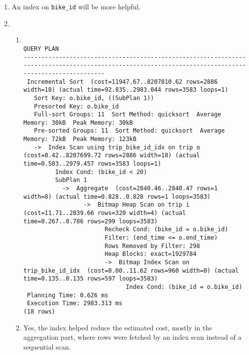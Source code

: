 \documentclass{homework}
\begin{document}
\begin{enumerate}[start=2]
    \item An index on \texttt{bike\_id} will be more helpful.
    

    \item \begin{enumerate}
        \item \begin{verbatim}
                                                                     QUERY PLAN
-----------------------------------------------------------------------------------------------------------------------------------------------------
 Incremental Sort  (cost=11947.67..8207810.62 rows=2886 width=18) (actual time=92.835..2983.044 rows=3583 loops=1)
   Sort Key: o.bike_id, ((SubPlan 1))
   Presorted Key: o.bike_id
   Full-sort Groups: 11  Sort Method: quicksort  Average Memory: 30kB  Peak Memory: 30kB
   Pre-sorted Groups: 11  Sort Method: quicksort  Average Memory: 72kB  Peak Memory: 123kB
   ->  Index Scan using trip_bike_id_idx on trip o  (cost=0.42..8207699.72 rows=2886 width=18) (actual time=0.503..2979.457 rows=3583 loops=1)
         Index Cond: (bike_id < 20)
         SubPlan 1
           ->  Aggregate  (cost=2840.46..2840.47 rows=1 width=8) (actual time=0.828..0.828 rows=1 loops=3583)
                 ->  Bitmap Heap Scan on trip i  (cost=11.71..2839.66 rows=320 width=4) (actual time=0.267..0.786 rows=299 loops=3583)
                       Recheck Cond: (bike_id = o.bike_id)
                       Filter: (end_time <= o.end_time)
                       Rows Removed by Filter: 298
                       Heap Blocks: exact=1929784
                       ->  Bitmap Index Scan on trip_bike_id_idx  (cost=0.00..11.62 rows=960 width=0) (actual time=0.135..0.135 rows=597 loops=3583)
                             Index Cond: (bike_id = o.bike_id)
 Planning Time: 0.626 ms
 Execution Time: 2983.313 ms
(18 rows)
\end{verbatim}
        \item Yes, the index helped reduce the estimated cost, mostly in the aggregation part, where rows were fetched by an index scan instead of a sequential scan.
        

\end{enumerate}
\end{enumerate}
\end{document}
